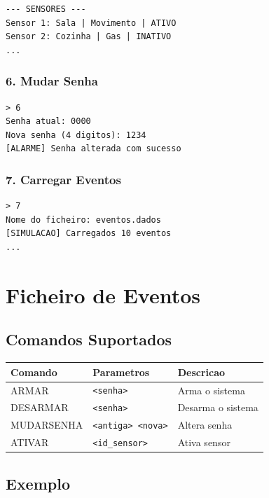 \documentclass[12pt,a4paper]{article}
\begin{document}
\begin{verbatim}
--- SENSORES ---
Sensor 1: Sala | Movimento | ATIVO
Sensor 2: Cozinha | Gas | INATIVO
...
\end{verbatim}

\subsubsection*{6. Mudar Senha}

\begin{verbatim}
> 6
Senha atual: 0000
Nova senha (4 digitos): 1234
[ALARME] Senha alterada com sucesso
\end{verbatim}

\subsubsection*{7. Carregar Eventos}

\begin{verbatim}
> 7
Nome do ficheiro: eventos.dados
[SIMULACAO] Carregados 10 eventos
...
\end{verbatim}

\newpage

\section{Ficheiro de Eventos}

\subsection{Comandos Suportados}

\begin{center}
\begin{tabular}{|l|l|p{5cm}|}
\hline
\textbf{Comando} & \textbf{Parametros} & \textbf{Descricao} \\
\hline
ARMAR & \texttt{<senha>} & Arma o sistema \\
\hline
DESARMAR & \texttt{<senha>} & Desarma o sistema \\
\hline
MUDARSENHA & \texttt{<antiga> <nova>} & Altera senha \\
\hline
ATIVAR & \texttt{<id\_sensor>} & Ativa sensor \\
\hline
\end{tabular}
\end{center}

\subsection{Exemplo}
\end{document}
